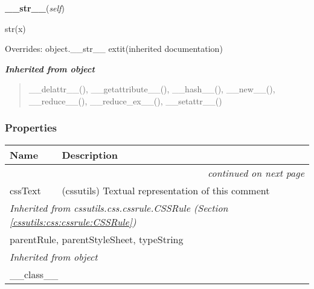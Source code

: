     \vspace{0.5ex}

\hspace{.8\funcindent}\begin{boxedminipage}{\funcwidth}

    \raggedright \textbf{\_\_str\_\_}(\textit{self})

\setlength{\parskip}{2ex}
    str(x)

\setlength{\parskip}{1ex}
      Overrides: object.\_\_str\_\_ 	extit{(inherited documentation)}

    \end{boxedminipage}


\large{\textbf{\textit{Inherited from object}}}

\begin{quote}
\_\_delattr\_\_(), \_\_getattribute\_\_(), \_\_hash\_\_(), \_\_new\_\_(), \_\_reduce\_\_(), \_\_reduce\_ex\_\_(), \_\_setattr\_\_()
\end{quote}


  \subsubsection{Properties}

    \vspace{-1cm}
\hspace{\varindent}\begin{longtable}{|p{\varnamewidth}|p{\vardescrwidth}|l}
\cline{1-2}
\cline{1-2} \centering \textbf{Name} & \centering \textbf{Description}& \\
\cline{1-2}
\endhead\cline{1-2}\multicolumn{3}{r}{\small\textit{continued on next page}}\\\endfoot\cline{1-2}
\endlastfoot\raggedright c\-s\-s\-T\-e\-x\-t\- & \raggedright (cssutils) Textual representation of this comment&\\
\cline{1-2}
\multicolumn{2}{|l|}{\textit{Inherited from cssutils.css.cssrule.CSSRule \textit{(Section \ref{cssutils:css:cssrule:CSSRule})}}}\\
\multicolumn{2}{|p{\varwidth}|}{\raggedright parentRule, parentStyleSheet, typeString}\\
\cline{1-2}
\multicolumn{2}{|l|}{\textit{Inherited from object}}\\
\multicolumn{2}{|p{\varwidth}|}{\raggedright \_\_class\_\_}\\
\cline{1-2}
\end{longtable}


